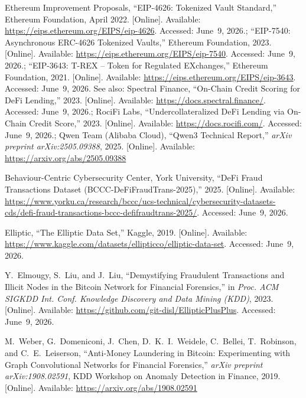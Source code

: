 \documentclass[12pt,a4paper]{report}
\begin{document}
{\begin{enumerate}[label={[\arabic*]}]
\item Ethereum Improvement Proposals, ``EIP-4626: Tokenized Vault Standard,'' Ethereum Foundation, April 2022. [Online]. Available: \url{https://eips.ethereum.org/EIPS/eip-4626}. Accessed: June~9, 2026.; ``EIP-7540: Asynchronous ERC-4626 Tokenized Vaults,'' Ethereum Foundation, 2023. [Online]. Available: \url{https://eips.ethereum.org/EIPS/eip-7540}. Accessed: June~9, 2026.; ``EIP-3643: T-REX -- Token for Regulated EXchanges,'' Ethereum Foundation, 2021. [Online]. Available: \url{https://eips.ethereum.org/EIPS/eip-3643}. Accessed: June~9, 2026. See also: Spectral Finance, ``On-Chain Credit Scoring for DeFi Lending,'' 2023. [Online]. Available: \url{https://docs.spectral.finance/}. Accessed: June~9, 2026.; RociFi Labs, ``Undercollateralized DeFi Lending via On-Chain Credit Score,'' 2023. [Online]. Available: \url{https://docs.rocifi.com/}. Accessed: June~9, 2026.; Qwen Team (Alibaba Cloud), ``Qwen3 Technical Report,'' \textit{arXiv preprint arXiv:2505.09388}, 2025. [Online]. Available: \url{https://arxiv.org/abs/2505.09388}
\item Behaviour-Centric Cybersecurity Center, York University, ``DeFi Fraud Transactions Dataset (BCCC-DeFiFraudTrans-2025),'' 2025. [Online]. Available: \url{https://www.yorku.ca/research/bccc/ucs-technical/cybersecurity-datasets-cds/defi-fraud-transactions-bccc-defifraudtrans-2025/}. Accessed: June~9, 2026.

\item Elliptic, ``The Elliptic Data Set,'' Kaggle, 2019. [Online]. Available: \url{https://www.kaggle.com/datasets/ellipticco/elliptic-data-set}. Accessed: June~9, 2026.

\item Y.~Elmougy, S.~Liu, and J.~Liu, ``Demystifying Fraudulent Transactions and Illicit Nodes in the Bitcoin Network for Financial Forensics,'' in \textit{Proc. ACM SIGKDD Int. Conf. Knowledge Discovery and Data Mining (KDD)}, 2023. [Online]. Available: \url{https://github.com/git-disl/EllipticPlusPlus}. Accessed: June~9, 2026.

\item M.~Weber, G.~Domeniconi, J.~Chen, D.~K.~I.~Weidele, C.~Bellei, T.~Robinson, and C.~E.~Leiserson, ``Anti-Money Laundering in Bitcoin: Experimenting with Graph Convolutional Networks for Financial Forensics,'' \textit{arXiv preprint arXiv:1908.02591}, KDD Workshop on Anomaly Detection in Finance, 2019. [Online]. Available: \url{https://arxiv.org/abs/1908.02591}


\end{enumerate}}
\end{document}
